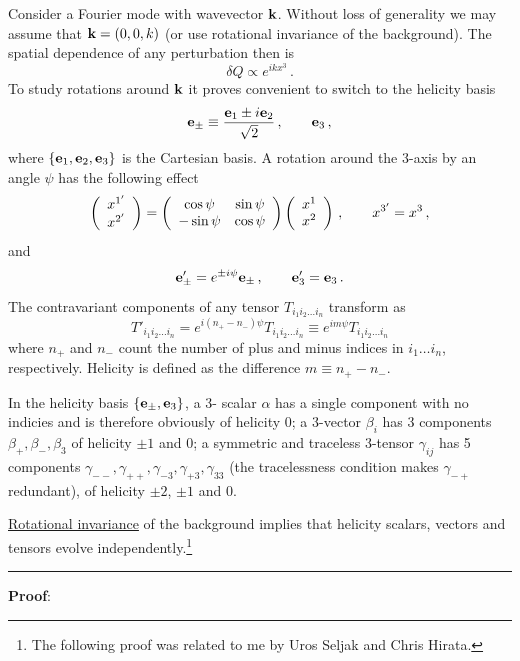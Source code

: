 \documentclass[12pt,letterpaper,rotate]{article}
\def\beq{\begin{equation}}
\def\eeq{\end{equation}}
\begin{document}
{\vskip 6pt
Consider a Fourier mode with wavevector ${\bf k}$. Without loss of generality we may assume that ${\bf k}=(0,0,k)$ (or use rotational invariance of the background). The spatial dependence of any perturbation then is
\beq
\delta Q \propto e^{i k x^3}\, .
\eeq 
To study rotations around ${\bf k}$ it proves convenient to switch to the helicity basis
\beq
{\bf e}_\pm \equiv \frac{{\bf e}_1 \pm i {\bf e}_2}{\sqrt{2}}\, , \qquad {\bf e}_3\, ,
\eeq
where $\{{\bf e}_1, {\bf e}_2, {\bf e}_3\}$ is the Cartesian basis.
A rotation around the 3-axis by an angle $\psi$ has the following effect
\beq
\left( \begin{array}{c} x^{1'}  \\ x^{2'}  \end{array}\right) = \left( \begin{array}{c c} \cos \psi & \sin \psi \\ -\sin \psi & \cos \psi \end{array}\right)  \left( \begin{array}{c} x^1 \\ x^2 \end{array}\right) \, , \qquad x^{3'} = x^3\, , 
\eeq
and
\beq	
 {\bf e}_\pm' = e^{\pm i \psi} {\bf e}_\pm\, , \qquad {\bf e}_3' ={\bf e}_3\, .
\eeq
The contravariant components of any tensor $T_{i_1 i_2 \dots i_n}$ transform as
\beq
T'_{i_1 i_2 \dots i_n} = e^{i(n_+ -n_-)\psi} T_{i_1 i_2 \dots i_n} \equiv e^{im \psi} T_{i_1 i_2 \dots i_n}
\eeq
where $n_+$ and $n_-$ count the number of plus and minus indices in $i_1 \dots i_n$, respectively. Helicity is defined as the difference $m \equiv n_+ - n_-$.

In the helicity basis $\{{\bf e}_\pm, {\bf e}_3\}$, a 3- scalar
 $\alpha$ has a single component with no indicies and is therefore obviously of helicity 0;
 a 3-vector $\beta_i$ has 3 components $\beta_+, \beta_-, \beta_3$ of helicity $\pm 1$ and 0;
 a symmetric and traceless 3-tensor $\gamma_{ij}$ has 5 components $\gamma_{--},  \gamma_{++},\gamma_{-3},  \gamma_{+3}, \gamma_{33}$ (the tracelessness condition makes $\gamma_{-+}$ redundant), of helicity $\pm 2$, $\pm 1$ and 0.

\vskip 6pt
\underline{Rotational invariance} of the background implies that helicity scalars, vectors and tensors evolve independently.\footnote{The following proof was related to me by Uros Seljak and Chris Hirata.}


\vspace{0.5cm}
 \hrule \vspace{0.3cm}
{\bf Proof}:

}
\end{document}
